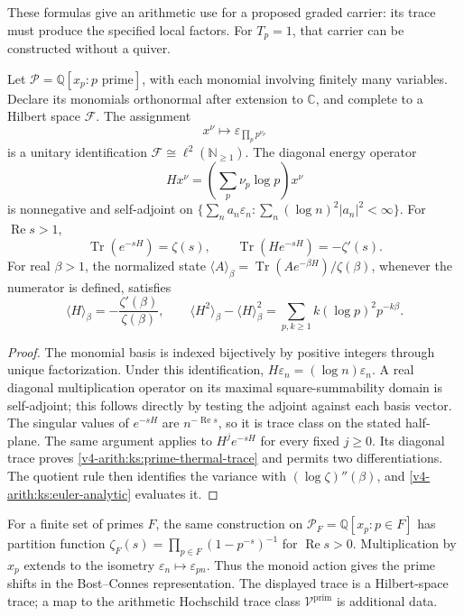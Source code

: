 These formulas give an arithmetic use for a proposed graded carrier:
its trace must produce the specified local factors. For $T_p=1$, that
carrier can be constructed without a quiver.

\begin{proposition}
\label{v4-arith:ks:prime-fock-trace}
\ClaimStatusProvedHere{}
Let $\mathcal P=\mathbb Q[x_p:p\text{ prime}]$, with each monomial
involving finitely many variables. Declare its monomials orthonormal
after extension to $\mathbb C$, and complete to a Hilbert space
$\mathcal F$. The assignment
\[
 x^\nu\longmapsto\varepsilon_{\prod_p p^{\nu_p}}
\]
is a unitary identification $\mathcal F\cong\ell^2(\mathbb N_{\geq1})$.
The diagonal energy operator
\[
 Hx^\nu=\left(\sum_p\nu_p\log p\right)x^\nu
\]
is nonnegative and self-adjoint on
$\{\sum_n a_n\varepsilon_n:\sum_n(\log n)^2|a_n|^2<\infty\}$.
For $\operatorname{Re}s>1$,
\begin{equation}
 \operatorname{Tr}(e^{-sH})=\zeta(s),\qquad
 \operatorname{Tr}(He^{-sH})=-\zeta'(s).
 \label{v4-arith:ks:prime-thermal-trace}
\end{equation}
For real $\beta>1$, the normalized state
$\langle A\rangle_\beta=\operatorname{Tr}(Ae^{-\beta H})/\zeta(\beta)$,
whenever the numerator is defined, satisfies
\[
 \langle H\rangle_\beta=-\frac{\zeta'(\beta)}{\zeta(\beta)},
 \qquad
 \langle H^2\rangle_\beta-\langle H\rangle_\beta^2
   =\sum_{p,k\geq1}k(\log p)^2p^{-k\beta}.
\]
\end{proposition}

\begin{proof}
The monomial basis is indexed bijectively by positive integers through
unique factorization. Under this identification, $H\varepsilon_n
=(\log n)\varepsilon_n$. A real diagonal multiplication operator on
its maximal square-summability domain is self-adjoint; this follows
directly by testing the adjoint against each basis vector.
The singular values of $e^{-sH}$ are $n^{-\operatorname{Re}s}$, so it
is trace class on the stated half-plane. The same argument applies to
$H^je^{-sH}$ for every fixed $j\geq0$. Its diagonal trace proves
\eqref{v4-arith:ks:prime-thermal-trace} and permits two differentiations.
The quotient rule then identifies the variance with
$(\log\zeta)''(\beta)$, and \eqref{v4-arith:ks:euler-analytic} evaluates it.
\end{proof}

For a finite set of primes $F$, the same construction on
$\mathcal P_F=\mathbb Q[x_p:p\in F]$ has partition function
$\zeta_F(s)=\prod_{p\in F}(1-p^{-s})^{-1}$ for
$\operatorname{Re}s>0$. Multiplication by $x_p$ extends to the isometry
$\varepsilon_n\mapsto\varepsilon_{pn}$. Thus the monoid action gives
the prime shifts in the Bost--Connes representation. The displayed
trace is a Hilbert-space trace; a map to the arithmetic Hochschild
trace class $\mathcal V^{\mathrm{prim}}$ is additional data.

